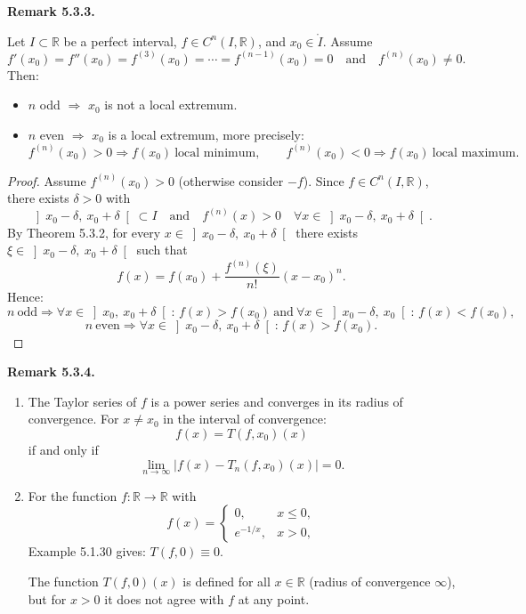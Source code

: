 \documentclass[12pt]{article}
\newenvironment{bemerkung}[1]{%
  \par\vspace{6pt}\noindent\textbf{Remark #1.}\itshape\space
}{%
  \par\vspace{6pt}
}
\begin{document}

\begin{bemerkung}{5.3.3}
Let $I \subset \mathbb{R}$ be a perfect interval, $f \in C^n(I,\mathbb{R})$, and $x_0 \in \mathring I$. Assume
\[
f'(x_0)=f''(x_0)=f^{(3)}(x_0)=\cdots=f^{(n-1)}(x_0)=0
\quad\text{and}\quad
f^{(n)}(x_0)\neq 0.
\]
Then:
\begin{itemize}
    \item $n$ odd $\Longrightarrow$ $x_0$ is not a local extremum.
    \item $n$ even $\Longrightarrow$ $x_0$ is a local extremum, more precisely:
    \[
    f^{(n)}(x_0)>0 \Longrightarrow f(x_0)\ \text{local minimum},
    \qquad
    f^{(n)}(x_0)<0 \Longrightarrow f(x_0)\ \text{local maximum}.
    \]
\end{itemize}

\begin{proof}
Assume $f^{(n)}(x_0)>0$ (otherwise consider $-f$).
Since $f\in C^n(I,\mathbb{R})$, there exists $\delta>0$ with
\[
\left]x_0-\delta,\ x_0+\delta\right[\subset I
\quad\text{and}\quad
f^{(n)}(x)>0
\quad
\forall x\in\left]x_0-\delta,\ x_0+\delta\right[.
\]
By Theorem 5.3.2, for every $x\in\left]x_0-\delta,\ x_0+\delta\right[$ there exists
$\xi\in\left]x_0-\delta,\ x_0+\delta\right[$ such that
\[
f(x)=f(x_0)+\frac{f^{(n)}(\xi)}{n!}(x-x_0)^n.
\]
Hence:
\[
n\ \text{odd} \Longrightarrow
\forall x\in\left]x_0,\ x_0+\delta\right[:\, f(x)>f(x_0)
\ \text{and}\
\forall x\in\left]x_0-\delta,\ x_0\right[:\, f(x)<f(x_0),
\]
\[
n\ \text{even} \Longrightarrow
\forall x\in\left]x_0-\delta,\ x_0+\delta\right[:\, f(x)>f(x_0).
\]
\end{proof}
\end{bemerkung}


\begin{bemerkung}{5.3.4}
\begin{enumerate}
    \item The Taylor series of $f$ is a power series and converges in its radius of convergence. For $x \neq x_0$ in the interval of convergence:
    \[
        f(x) = T(f,x_0)(x)
    \]
    if and only if
    \[
        \lim_{n\to\infty}\left|f(x)-T_n(f,x_0)(x)\right|=0.
    \]

    \item For the function $f:\mathbb{R}\to\mathbb{R}$ with
    \[
        f(x)=
        \begin{cases}
            0, & x\le 0,\\
            e^{-1/x}, & x>0,
        \end{cases}
    \]
    Example 5.1.30 gives: $T(f,0)\equiv 0$.

    The function $T(f,0)(x)$ is defined for all $x\in\mathbb{R}$ (radius of convergence $\infty$), but for $x>0$ it does not agree with $f$ at any point.
\end{enumerate}
\end{bemerkung}
\end{document}
